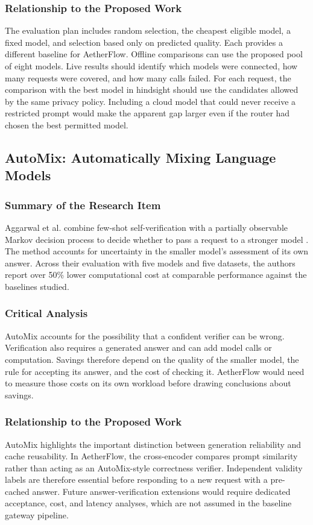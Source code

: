 \documentclass{FastFyp}
\begin{document}
\subsubsection{Relationship to the Proposed Work}
The evaluation plan includes random selection, the cheapest eligible model, a fixed model, and selection based only on predicted quality. Each provides a different baseline for AetherFlow. Offline comparisons can use the proposed pool of eight models. Live results should identify which models were connected, how many requests were covered, and how many calls failed. For each request, the comparison with the best model in hindsight should use the candidates allowed by the same privacy policy. Including a cloud model that could never receive a restricted prompt would make the apparent gap larger even if the router had chosen the best permitted model.

\subsection{AutoMix: Automatically Mixing Language Models}
\subsubsection{Summary of the Research Item}
Aggarwal et al. combine few-shot self-verification with a partially observable Markov decision process to decide whether to pass a request to a stronger model \cite{ref:AutoMix}. The method accounts for uncertainty in the smaller model's assessment of its own answer. Across their evaluation with five models and five datasets, the authors report over 50\% lower computational cost at comparable performance against the baselines studied.

\subsubsection{Critical Analysis}
AutoMix accounts for the possibility that a confident verifier can be wrong. Verification also requires a generated answer and can add model calls or computation. Savings therefore depend on the quality of the smaller model, the rule for accepting its answer, and the cost of checking it. AetherFlow would need to measure those costs on its own workload before drawing conclusions about savings.

\subsubsection{Relationship to the Proposed Work}
AutoMix highlights the important distinction between generation reliability and cache reusability. In AetherFlow, the cross-encoder compares prompt similarity rather than acting as an AutoMix-style correctness verifier. Independent validity labels are therefore essential before responding to a new request with a pre-cached answer. Future answer-verification extensions would require dedicated acceptance, cost, and latency analyses, which are not assumed in the baseline gateway pipeline.
\end{document}
